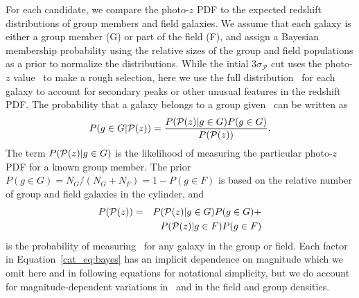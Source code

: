 For each candidate, we compare the photo-$z$ PDF to the expected
redshift distributions of group members and field galaxies.
We assume that each galaxy is either a group member (G) or part of the
field (F), and assign a Bayesian membership probability using the
relative sizes of the group and field populations as a prior to
normalize the distributions. While the intial $3\sigma_{\mathcal{P}}$
cut uses the photo-$z$ value \zp\ to make a rough selection, here we
use the full distribution \pz\ for each galaxy to account for
secondary peaks or other unusual features in the redshift PDF. The
probability that a galaxy belongs to a group given \pz\ can be written as 
\begin{equation}
\label{cat_eq:bayes}
P(g \in G|\mbox{$\mathcal{P}(z)$}) = \frac{P(\mbox{$\mathcal{P}(z)$}|g \in G) P(g \in G)}{P(\mbox{$\mathcal{P}(z)$})}.
\end{equation}
The term $P(\mbox{$\mathcal{P}(z)$}|g \in G)$ is the likelihood of measuring the particular
photo-$z$ PDF for a known group member. The prior $P(g \in G) =
N_{G}/(N_{G}+N_{F}) = 1-P(g \in F)$ is based on the relative number of
group and field galaxies in the cylinder, and 
\begin{eqnarray}
P(\mbox{$\mathcal{P}(z)$}) &=& P(\mbox{$\mathcal{P}(z)$}|g \in G) P(g \in G) + \nonumber \\
          &  & P(\mbox{$\mathcal{P}(z)$}|g \in F) P(g \in F)
\end{eqnarray}
is the probability of measuring \pz\ for any galaxy in the group or
field. Each factor in Equation~\ref{cat_eq:bayes} has an implicit
dependence on magnitude which we omit here and in following equations for notational
simplicity, but we do account for magnitude-dependent variations in
\pz\ and in the field and group densities.

